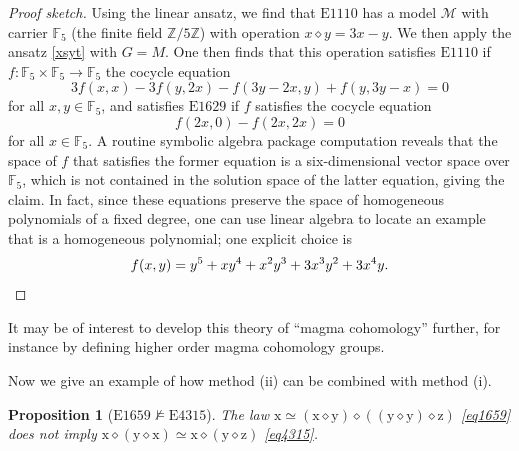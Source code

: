 \documentclass[12pt]{amsart}
\newtheorem{proposition}[theorem]{Proposition}
\theoremstyle{definition}
\newcommand{\Z}{\mathbb{Z}}
\newcommand{\F}{\mathbb{F}}
\newcommand{\x}{\mathrm{x}}
\newcommand{\y}{\mathrm{y}}
\newcommand{\z}{\mathrm{z}}
\newcommand{\op}{\diamond}
\newcommand{\formaleq}{\simeq}
\newcommand{\nmodels}{\not\models}
\newcommand{\Magma}{{\mathcal{M}}}
\newcommand{\Eq}[1]{\mathrm{E}#1}
\begin{document}
\begin{proof}[Proof sketch] Using the linear ansatz, we find that $\Eq{1110}$ has a model $\Magma$ with carrier $\F_5$ (the finite field $\Z/5\Z$) with operation $x \op y = 3x-y$.  We then apply the ansatz \eqref{xsyt} with $G=M$.  One then finds that this operation satisfies $\Eq{1110}$ if $f \colon \F_5 \times \F_5 \to \F_5$  the cocycle equation
  $$3f(x,x) - 3f(y,2x) - f(3y-2x,y) + f(y,3y-x) = 0$$
for all $x,y \in \F_5$, and satisfies $\Eq{1629}$ if $f$ satisfies the cocycle equation
$$ f(2x,0) - f(2x,2x) = 0$$
for all $x \in \F_5$.  A routine symbolic algebra package computation reveals that the space of $f$ that satisfies the former equation is a six-dimensional vector space over $\F_5$, which is not contained in the solution space of the latter equation, giving the claim.
In fact, since these equations preserve the space of homogeneous polynomials of a fixed degree, one can use linear algebra to locate an example that is a homogeneous polynomial; one explicit choice is
\[
f(x,y) = y^5 +xy^4 + x^2y^3 +3x^3 y^2 + 3x^4 y. \qedhere
\]
\end{proof}

It may be of interest to develop this theory of ``magma cohomology'' further, for instance by defining higher order magma cohomology groups.

Now we give an example of how method (ii) can be combined with method (i).

\begin{proposition}[$\Eq{1659} \nmodels \Eq{4315}$]\label{1659-4315} The law $\x \formaleq (\x \op \y) \op ((\y \op \y) \op \z)$ \eqref{eq1659} does not imply $\x \op (\y \op \x) \formaleq \x \op (\y \op \z)$ \eqref{eq4315}.
\end{proposition}
\end{document}
